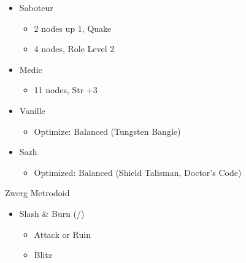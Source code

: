 \begin{multicols}{2}
\begin{menu}
\begin{itemize}
\begin{itemize}
\begin{itemize}
\begin{itemize}
            \end{itemize}
            \item Saboteur
            \begin{itemize}
                \item 2 nodes up 1, Quake
                \item 4 nodes, Role Level 2
            \end{itemize}
            \item Medic
            \begin{itemize}
                \item 11 nodes, Str +3
            \end{itemize}
        \end{itemize}
    \end{itemize}
    \columnbreak
    \equip
    \begin{itemize}
        \item Vanille
        \begin{itemize}
            \item \begin{flushleft}Optimize: Balanced (Tungsten Bangle)\end{flushleft}
        \end{itemize}
        \item Sazh
        \begin{itemize}
            \item \begin{flushleft}Optimized: Balanced (Shield Talisman, Doctor's Code)\end{flushleft}
        \end{itemize}
    \end{itemize}
\end{itemize}
\end{menu}
\renewcommand{\first}{[1] Slash \& Burn (\com/\rav)}
\renewcommand{\second}{[2] War \& Peace (\com/\med)}
\renewcommand{\third}{[3] Tide Turner (\syn/\sab)}
\renewcommand{\fourth}{[4] }
\renewcommand{\fifth}{[5] Undermine (\rav/\sab)}
\renewcommand{\sixth}{[6] Divide \& Conquer (\com/\sab)}

\begin{battle}{Zwerg Metrodoid}
\begin{itemize}
    \item \first
    \begin{itemize}
        \item Attack or Ruin
        \item Blitz
    \end{itemize}
\end{itemize}
\end{battle}


\end{multicols}
